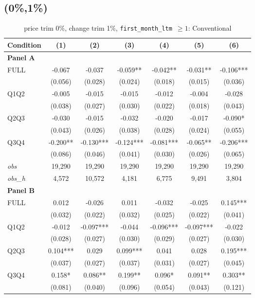 \subsection{(0\%,1\%)}
\begin{table}[!htbp]
\centering
\caption{price trim 0\%, change trim 1\%, \texttt{first\_month\_ltm $\geq 1$}: Conventional}
\label{tab:abc:trim01:ltm1:conventional}
\small
\begin{tabular}{lcccccc}
\toprule
Condition & (1) & (2) & (3) & (4) & (5) & (6) \\
\midrule
\textbf{Panel A} &&&&&&  \\

FULL & -0.067 & -0.037 & -0.059** & -0.042** & -0.031** & -0.106*** \\
 & (0.056) & (0.028) & (0.024) & (0.018) & (0.015) & (0.036) \\
Q1Q2 & -0.005 & -0.015 & -0.015 & -0.012 & -0.004 & -0.028 \\
 & (0.038) & (0.027) & (0.030) & (0.022) & (0.018) & (0.043) \\
Q2Q3 & -0.030 & -0.015 & -0.032 & -0.020 & -0.017 & -0.090* \\
 & (0.043) & (0.026) & (0.038) & (0.028) & (0.024) & (0.055) \\
Q3Q4 & -0.200** & -0.130*** & -0.124*** & -0.081*** & -0.065** & -0.206*** \\
 & (0.086) & (0.046) & (0.041) & (0.030) & (0.026) & (0.065) \\

\textit{obs} & 19,290 & 19,290 & 19,290 & 19,290 & 19,290 & 19,290 \\
\textit{obs\_h} &  4,572 & 10,572 &  4,181 &  6,775 &  9,491 &  3,804 \\

\textbf{Panel B} &&&&&&  \\

FULL & 0.012 & -0.026 & 0.011 & -0.032 & -0.025 & 0.145*** \\
 & (0.032) & (0.022) & (0.032) & (0.025) & (0.022) & (0.041) \\
Q1Q2 & -0.012 & -0.097*** & -0.044 & -0.096*** & -0.097*** & -0.022 \\
 & (0.028) & (0.027) & (0.030) & (0.029) & (0.027) & (0.030) \\
Q2Q3 & 0.104*** & 0.029 & 0.099*** & 0.041 & 0.028 & 0.195*** \\
 & (0.037) & (0.027) & (0.037) & (0.031) & (0.027) & (0.045) \\
Q3Q4 & 0.158* & 0.086** & 0.199** & 0.096* & 0.091** & 0.303** \\
 & (0.081) & (0.040) & (0.096) & (0.054) & (0.043) & (0.121) \\


\end{tabular}
\end{table}
